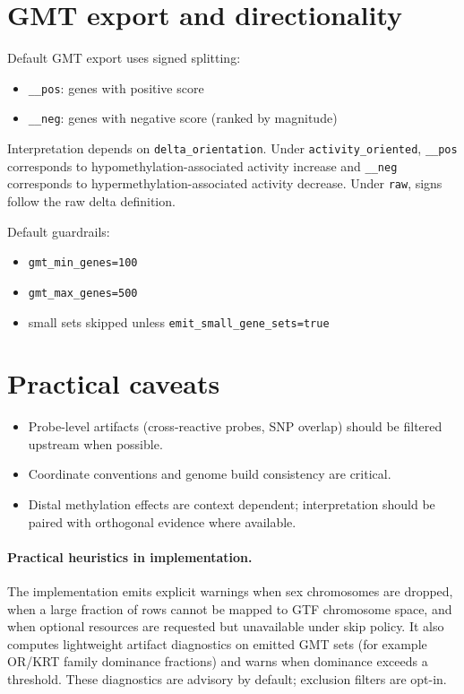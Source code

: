 \documentclass[11pt]{article}
\begin{document}
\section{GMT export and directionality}
Default GMT export uses signed splitting:
\begin{itemize}[leftmargin=2em]
\item \texttt{\_\_pos}: genes with positive score
\item \texttt{\_\_neg}: genes with negative score (ranked by magnitude)
\end{itemize}

Interpretation depends on \texttt{delta\_orientation}. Under \texttt{activity\_oriented}, \texttt{\_\_pos} corresponds to hypomethylation-associated activity increase and \texttt{\_\_neg} corresponds to hypermethylation-associated activity decrease. Under \texttt{raw}, signs follow the raw delta definition.

Default guardrails:
\begin{itemize}[leftmargin=2em]
\item \texttt{gmt\_min\_genes=100}
\item \texttt{gmt\_max\_genes=500}
\item small sets skipped unless \texttt{emit\_small\_gene\_sets=true}
\end{itemize}

\section{Practical caveats}
\begin{itemize}[leftmargin=2em]
\item Probe-level artifacts (cross-reactive probes, SNP overlap) should be filtered upstream when possible.
\item Coordinate conventions and genome build consistency are critical.
\item Distal methylation effects are context dependent; interpretation should be paired with orthogonal evidence where available.
\end{itemize}

\paragraph{Practical heuristics in implementation.}
The implementation emits explicit warnings when sex chromosomes are dropped, when a large fraction of rows cannot be mapped to GTF chromosome space, and when optional resources are requested but unavailable under skip policy. It also computes lightweight artifact diagnostics on emitted GMT sets (for example OR/KRT family dominance fractions) and warns when dominance exceeds a threshold. These diagnostics are advisory by default; exclusion filters are opt-in.
\end{document}
